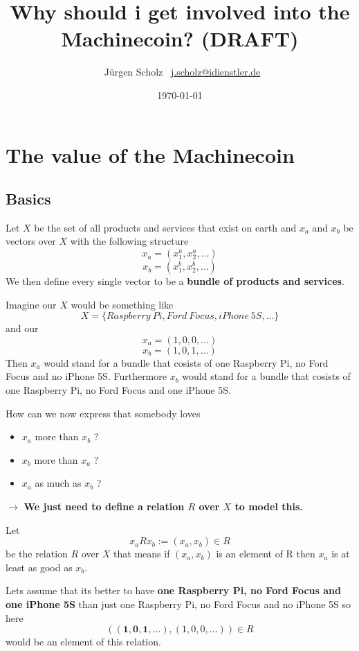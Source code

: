 \documentclass{beamer}
\title{Why should i get involved into the Machinecoin? (DRAFT)}
\author{\texorpdfstring{\ Jürgen Scholz \ \newline\url{j.scholz@idienstler.de}}{Author}}
\institute{iDienstler.de $-$ simply make apps and love the\enquote{i}}
\date{\today}
\begin{document}
\frame{\titlepage}

\section{The value of the Machinecoin}
\subsection{Basics}
\frame
{
 \begin{definition}
   Let $X$ be the set of all products and services that exist on earth and $x_a$ and $x_b$ be vectors over $X$ with the following structure 
   $$x_{a}=(x_{1}^a, x_{2}^a, \dots )$$
   $$x_{b}=(x_{1}^b, x_{2}^b, \dots )$$
   We then define every single vector to be a \textbf{bundle of products and services}. 
 \end{definition}
}
\frame
{
  \begin{example}
   Imagine our $X$ would be something like
   $$X=\{Raspberry\ Pi, Ford\ Focus, iPhone\ 5S, \dots \}$$
   and our 
   $$x_{a}=(1,0,0, \dots)$$
   $$x_{b}=(1,0,1, \dots)$$
   Then $x_{a}$ would stand for a bundle that cosists of one Raspberry Pi, no Ford Focus and no iPhone 5S. Furthermore $x_{b}$ would stand for a bundle that cosists of one Raspberry Pi, no Ford Focus and one iPhone 5S.
 \end{example}
}
\frame
{
  How can we now express that somebody loves 
  \begin{itemize}
  \item $x_{a}$ more than $x_{b}$ ?
  \item $x_{b}$ more than $x_{a}$  ?
  \item $x_{a}$ as much as $x_{b}$ ?
  \end{itemize}
  $\rightarrow$ \textbf{We just need to define a relation $R$ over $X$ to model this.}
}
\frame
{
 \begin{definition}
   Let 
   $$x_{a}Rx_{b}:=(x_{a},x_{b}) \in R$$
   be the relation $R$ over $X$ that means if  $(x_{a},x_{b})$ is an element of R then $x_{a}$ is at least as good as $x_{b}$. 
 \end{definition}
 \begin{example}
 Lets assume that its better to have  \textbf{one Raspberry Pi, no Ford Focus and one iPhone 5S} than just one Raspberry Pi, no Ford Focus and no iPhone 5S so here 
 $$((\textbf{1},\textbf{0},\textbf{1}, \dots),(1,0,0, \dots))\in R$$
 would be an element of this relation.
 \end{example}
}
\end{document}
